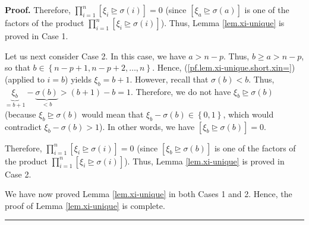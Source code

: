 \documentclass[numbers=enddot,12pt,final,onecolumn,notitlepage,english]{scrartcl}%
\theoremstyle{definition}
\newenvironment{proof}[1][Proof]{\noindent\textbf{#1.} }{\ \rule{0.5em}{0.5em}}
\let\prodnonlimits\prod
\renewcommand{\prod}{\prodnonlimits\limits}
\newenvironment{vershort}{}{}
\begin{document}
\begin{vershort}
\begin{proof}
Therefore, $\prod_{i=1}^{n}\left[  \xi_{i}\trianglerighteq\sigma\left(
i\right)  \right]  =0$ (since $\left[  \xi_{a}\trianglerighteq\sigma\left(
a\right)  \right]  $ is one of the factors of the product $\prod_{i=1}%
^{n}\left[  \xi_{i}\trianglerighteq\sigma\left(  i\right)  \right]  $). Thus,
Lemma \ref{lem.xi-unique} is proved in Case 1.

Let us next consider Case 2. In this case, we have $a>n-p$. Thus, $b\geq
a>n-p$, so that $b\in\left\{  n-p+1,n-p+2,\ldots,n\right\}  $. Hence,
(\ref{pf.lem.xi-unique.short.xin=}) (applied to $i=b$) yields $\xi_{b}=b+1$.
However, recall that $\sigma\left(  b\right)  <b$. Thus, $\underbrace{\xi_{b}%
}_{=b+1}-\underbrace{\sigma\left(  b\right)  }_{<b}>\left(  b+1\right)  -b=1$.
Therefore, we do not have $\xi_{b}\trianglerighteq\sigma\left(  b\right)  $
(because $\xi_{b}\trianglerighteq\sigma\left(  b\right)  $ would mean that
$\xi_{b}-\sigma\left(  b\right)  \in\left\{  0,1\right\}  $, which would
contradict $\xi_{b}-\sigma\left(  b\right)  >1$). In other words, we have
$\left[  \xi_{b}\trianglerighteq\sigma\left(  b\right)  \right]  =0$.

Therefore, $\prod_{i=1}^{n}\left[  \xi_{i}\trianglerighteq\sigma\left(
i\right)  \right]  =0$ (since $\left[  \xi_{b}\trianglerighteq\sigma\left(
b\right)  \right]  $ is one of the factors of the product $\prod_{i=1}%
^{n}\left[  \xi_{i}\trianglerighteq\sigma\left(  i\right)  \right]  $). Thus,
Lemma \ref{lem.xi-unique} is proved in Case 2.

We have now proved Lemma \ref{lem.xi-unique} in both Cases 1 and 2. Hence, the
proof of Lemma \ref{lem.xi-unique} is complete.
\end{proof}
\end{vershort}
\end{document}
